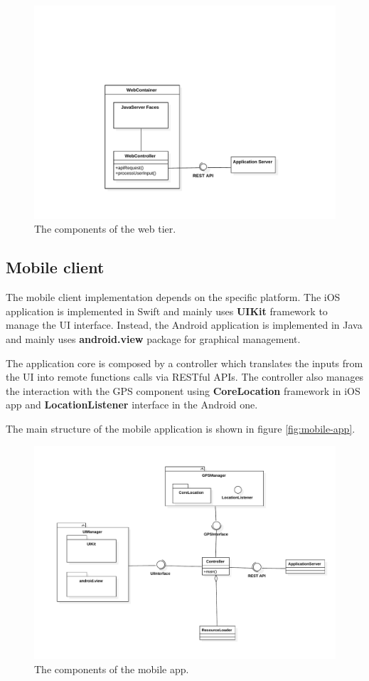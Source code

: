\begin{figure}
    \centering
    \includegraphics[width=\textwidth]{diagrams/class_webcomponents}
    \caption{The components of the web tier.}
    \label{fig:web-components}
\end{figure}

\subsection{Mobile client}
\label{sec:mobile-client}
The mobile client implementation depends on the specific platform. 
The iOS application is implemented in Swift and mainly uses \textbf{UIKit} framework to manage the UI interface.
Instead, the Android application is implemented in Java and mainly uses \textbf{android.view} package for graphical management.

The application core is composed by a controller which translates the inputs from the UI into remote functions calls via  RESTful APIs. The controller also manages the interaction with the GPS component using  \textbf{CoreLocation} framework in iOS app and \textbf{LocationListener} interface in the Android one.

The main structure of the mobile application is shown in figure \autoref{fig:mobile-app}.

\begin{figure}
    \centering
    \includegraphics[width=\textwidth]{diagrams/class_mobileapp}
    \caption{The components of the mobile app.}
    \label{fig:mobile-app}
\end{figure}


\FloatBarrier
